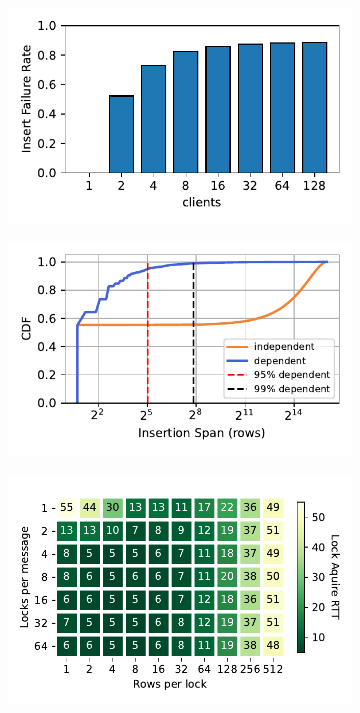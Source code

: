 \begin{figure}[t]
    \centering
    \begin{subfigure}{0.3\linewidth}
        \includegraphics[width=0.99\linewidth]{fig/optimistic_failures.pdf}
    \end{subfigure}
    \begin{subfigure}{0.3\linewidth}
        \includegraphics[width=0.99\linewidth]{fig/insertion_span.pdf}
    \end{subfigure}
    \begin{subfigure}{0.3\linewidth}
        \includegraphics[width=0.99\linewidth]{fig/buckets_per_lock_vs_locks_per_message.pdf}

\end{subfigure}
\end{figure}
